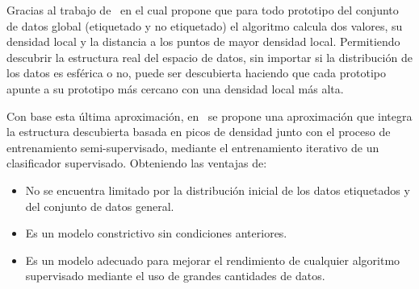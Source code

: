 Gracias al trabajo de~\cite{rodriguez2014clustering} en el cual propone que para todo prototipo del conjunto de datos global (etiquetado y no etiquetado) el algoritmo calcula dos valores, su densidad local y la distancia a los puntos de mayor densidad local. Permitiendo descubrir la estructura real del espacio de datos, sin importar si la distribución de los datos es esférica o no, puede ser descubierta haciendo que cada prototipo apunte a su prototipo más cercano con una densidad local más alta.

Con base esta última aproximación, en~\cite{wu2018self} se propone una aproximación que integra la estructura descubierta basada en picos de densidad junto con el proceso de entrenamiento semi-supervisado, mediante el entrenamiento iterativo de un clasificador supervisado. Obteniendo las ventajas de:
\begin{itemize}
\item No se encuentra limitado por la distribución inicial de los datos etiquetados y del conjunto de datos general.
\item Es un modelo constrictivo sin condiciones anteriores.
\item Es un modelo adecuado para mejorar el rendimiento de cualquier algoritmo supervisado mediante el uso de grandes cantidades de datos.
\end{itemize}